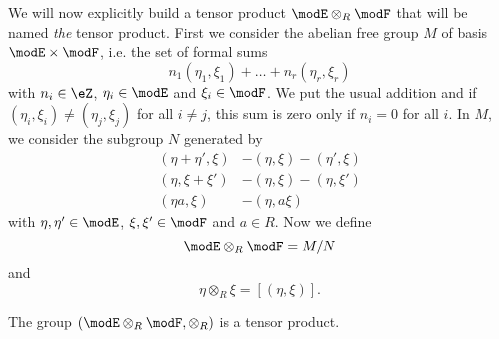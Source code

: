 We will now explicitly build a tensor product $\modE\otimes_R\modF$ that will be named \emph{the} tensor product. First we consider the abelian free group $M$ of basis $\modE\times\modF$, i.e. the set of formal sums
\[ 
  n_1(\eta_1,\xi_1)+\ldots+n_r(\eta_r,\xi_r)
\]
with $n_i\in\eZ$, $\eta_i\in\modE$ and $\xi_i\in\modF$. We put the usual addition and if $(\eta_i,\xi_i)\neq(\eta_j,\xi_j)$ for all $i\neq j$, this sum is zero only if $n_i=0$ for all $i$. In $M$, we consider the subgroup $N$ generated by
\begin{subequations}
\begin{align}
(\eta+\eta',\xi)&-(\eta,\xi)-(\eta',\xi)\\
(\eta,\xi+\xi')&-(\eta,\xi)-(\eta,\xi')\\
(\eta a,\xi)&-(\eta, a\xi)
\end{align}
\end{subequations}
with $\eta,\eta'\in\modE$, $\xi,\xi'\in\modF$ and $a\in R$. Now we define 
\begin{equation}
\modE\otimes_R\modF=M/N
\end{equation}
and 
\begin{equation}
\eta\otimes_R\xi=[(\eta,\xi)].
\end{equation}

\begin{proposition}
The group $(\modE\otimes_R\modF,\otimes_R)$ is a tensor product.
\end{proposition}

